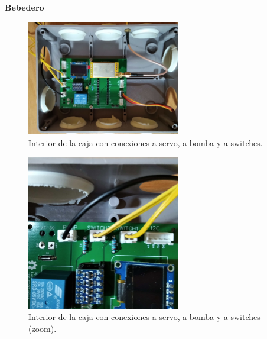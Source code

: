 \documentclass[12pt]{article}
\begin{document}
	\pagebreak
	
	\noindent \textbf{Bebedero} \\

	\begin{figure}[h]
		\begin{center}
			\includegraphics[width=0.6\textwidth]{img/Fotos bebedero/caja_bomba_conexion_rotated.jpg}
			\caption{Interior de la caja con conexiones a servo, a bomba y a switches.}
			\label{Prototipo: bebedero conexiones}
		\end{center}
	\end{figure}

	\pagebreak
	
	\begin{figure}[h]
		\begin{center}
			\includegraphics[width=0.6\textwidth]{img/Fotos bebedero/caja_bomba_conexion_zoom.jpg}
			\caption{Interior de la caja con conexiones a servo, a bomba y a switches (zoom).}
			\label{Prototipo: bebedero conexiones (zoom)}
		\end{center}
	\end{figure}

	\pagebreak
	
\end{document}
